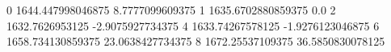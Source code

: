 0 1644.447998046875 8.7777099609375
1 1635.6702880859375 0.0
2 1632.7626953125 -2.9075927734375
4 1633.74267578125 -1.9276123046875
6 1658.734130859375 23.0638427734375
8 1672.25537109375 36.5850830078125
